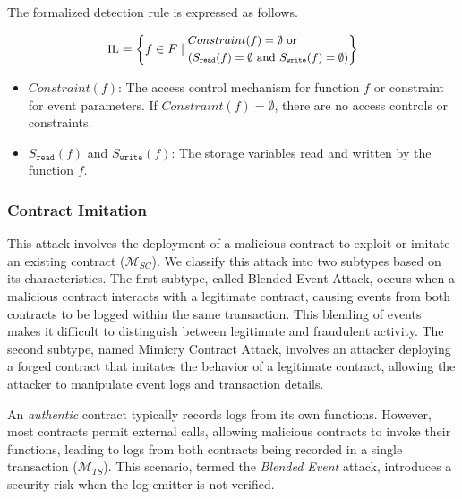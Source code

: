 The formalized detection rule is expressed as follows.

\begin{equation}
\small
\text{IL} = \left\{
f \in F \mid
\begin{aligned}
  & Constraint(f) = \emptyset \text{ or } \\
  & (S_{\texttt{read}}(f) = \emptyset \text{ and } S_{\texttt{write}}(f) = \emptyset)
\end{aligned}
\right\}
\end{equation}


\begin{itemize}
    \item \( Constraint(f) \): The access control mechanism for function \( f \) or constraint for event parameters. If \( Constraint(f) = \emptyset \), there are no access controls or constraints.
    \item \( S_{\texttt{read}}(f) \) and \( S_{\texttt{write}}(f) \): The storage variables read and written by the function \( f \).
\end{itemize}

\subsubsection{Contract Imitation}\label{vec:attack3}

This attack involves the deployment of a malicious contract to exploit or imitate an existing contract (\(\bm{\mathcal{M}}_{SC}\)). We classify this attack into two subtypes based on its characteristics. The first subtype, called Blended Event Attack, occurs when a malicious contract interacts with a legitimate contract, causing events from both contracts to be logged within the same transaction. This blending of events makes it difficult to distinguish between legitimate and fraudulent activity. The second subtype, named Mimicry Contract Attack, involves an attacker deploying a forged contract that imitates the behavior of a legitimate contract, allowing the attacker to manipulate event logs and transaction details.


An \emph{authentic} contract typically records logs from its own functions. However, most contracts permit external calls, allowing malicious contracts to invoke their functions, leading to logs from both contracts being recorded in a single transaction (\(\bm{\mathcal{M}}_{TS}\)). This scenario, termed the \emph{Blended Event} attack, introduces a security risk when the log emitter is not verified.


